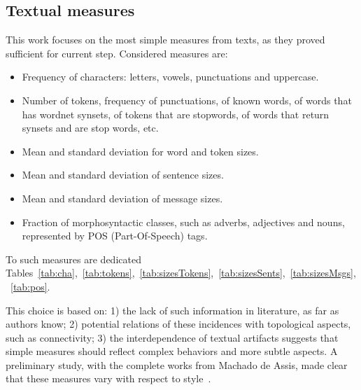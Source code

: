 \documentclass[%
 aip,
 jmp,%
 amsmath,amssymb,
 reprint,%
]{revtex4-1}
\begin{document}

\subsection{Textual measures}
This work focuses on the most simple measures from texts, as they proved sufficient for current step.
Considered measures are:
\begin{itemize}
    \item Frequency of characters: letters, vowels, punctuations and uppercase.
    \item Number of tokens, frequency of punctuations, of known words, of words that has wordnet synsets, of tokens that are stopwords, of words that return synsets and are stop words, etc.
    \item Mean and standard deviation for word and token sizes.
    \item Mean and standard deviation of sentence sizes.
    \item Mean and standard deviation of message sizes.
    \item Fraction of morphosyntactic classes, such as adverbs, adjectives and nouns, represented by POS (Part-Of-Speech) tags.
\end{itemize}
\noindent To such measures are dedicated Tables~\ref{tab:cha},~\ref{tab:tokens},~\ref{tab:sizesTokens},~\ref{tab:sizesSents},~\ref{tab:sizesMsgs},~\ref{tab:pos}.

This choice is based on: 1) the lack of such information in literature, as far as authors know; 
2) potential relations of these incidences with topological aspects, such as connectivity; 3) the interdependence of textual artifacts suggests that simple measures should reflect complex behaviors and more subtle aspects.
A preliminary study, with the complete works from Machado de Assis, made clear that these measures vary with respect to style~\cite{letrasMachado}.
\end{document}
